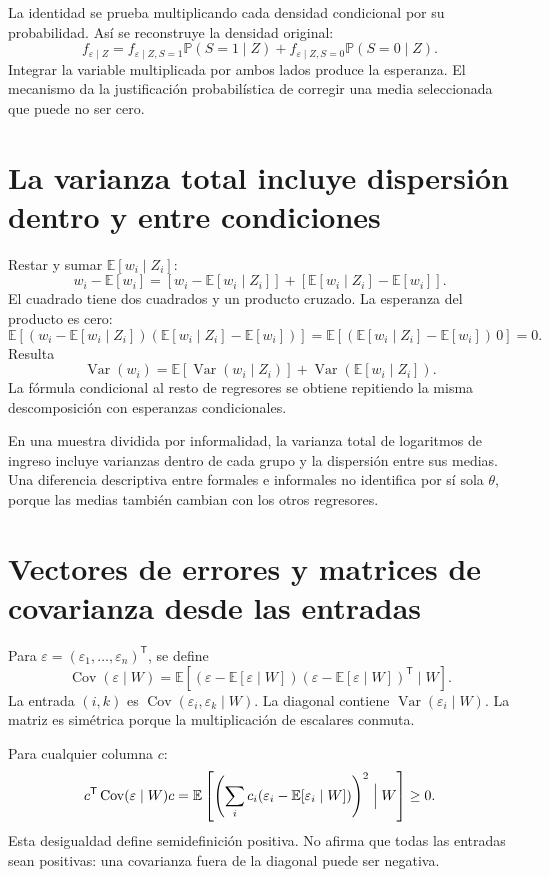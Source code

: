 \documentclass[11pt,a4paper]{article}
\newcommand{\E}{\mathbb E}
\newcommand{\Prob}{\mathbb P}
\DeclareMathOperator{\Var}{Var}
\DeclareMathOperator{\Cov}{Cov}
\begin{document}
La identidad se prueba multiplicando cada densidad condicional por su probabilidad. Así se reconstruye la densidad original:
\[
f_{\varepsilon\mid Z}
=f_{\varepsilon\mid Z,S=1}\Prob(S=1\mid Z)
+f_{\varepsilon\mid Z,S=0}\Prob(S=0\mid Z).
\]
Integrar la variable multiplicada por ambos lados produce la esperanza. El mecanismo da la justificación probabilística de corregir una media seleccionada que puede no ser cero.

\clearpage
\section{La varianza total incluye dispersión dentro y entre condiciones}

Restar y sumar $\E[w_i\mid Z_i]$:
\[
w_i-\E[w_i]
=[w_i-\E[w_i\mid Z_i]]
+[\E[w_i\mid Z_i]-\E[w_i]].
\]
El cuadrado tiene dos cuadrados y un producto cruzado. La esperanza del producto es cero:
\[
\E\!\left[(w_i-\E[w_i\mid Z_i])
(\E[w_i\mid Z_i]-\E[w_i])\right]
=\E[(\E[w_i\mid Z_i]-\E[w_i])\,0]=0.
\]
Resulta
\[
\Var(w_i)=\E[\Var(w_i\mid Z_i)]
+\Var(\E[w_i\mid Z_i]).
\]
La fórmula condicional al resto de regresores se obtiene repitiendo la misma descomposición con esperanzas condicionales.

En una muestra dividida por informalidad, la varianza total de logaritmos de ingreso incluye varianzas dentro de cada grupo y la dispersión entre sus medias. Una diferencia descriptiva entre formales e informales no identifica por sí sola $\theta$, porque las medias también cambian con los otros regresores.

\clearpage
\section{Vectores de errores y matrices de covarianza desde las entradas}

Para $\varepsilon=(\varepsilon_1,\ldots,\varepsilon_n)^{\mathsf T}$, se define
\[
\Cov(\varepsilon\mid W)=
\E[(\varepsilon-\E[\varepsilon\mid W])
(\varepsilon-\E[\varepsilon\mid W])^{\mathsf T}\mid W].
\]
La entrada $(i,k)$ es $\Cov(\varepsilon_i,\varepsilon_k\mid W)$. La diagonal contiene $\Var(\varepsilon_i\mid W)$. La matriz es simétrica porque la multiplicación de escalares conmuta.

Para cualquier columna $c$:
\[
c^{\mathsf T}\Cov(\varepsilon\mid W)c
=\E\left[\left(\sum_i c_i
(\varepsilon_i-\E[\varepsilon_i\mid W])\right)^2\Bigm|W\right]\ge0.
\]
Esta desigualdad define semidefinición positiva. No afirma que todas las entradas sean positivas: una covarianza fuera de la diagonal puede ser negativa.
\end{document}
